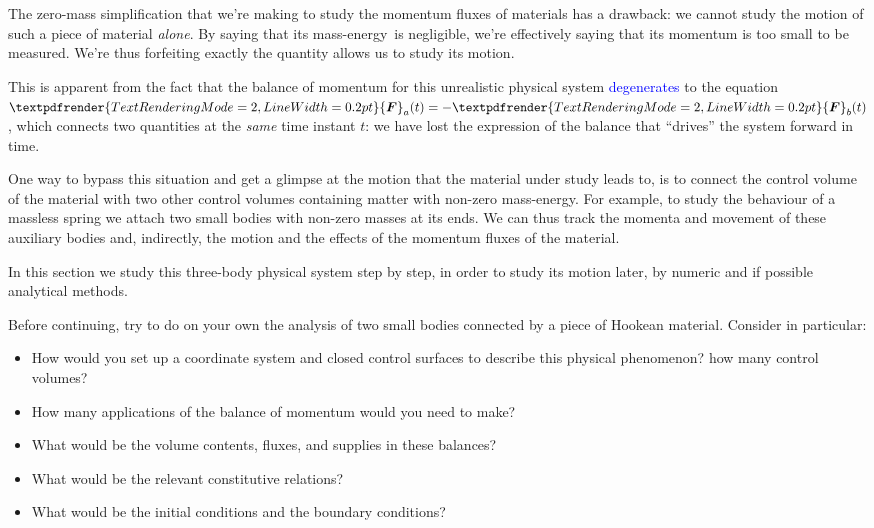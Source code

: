 \documentclass[a4paper,12pt,%
onecolumn,oneside,%
british%
]{memoir}
\renewcommand*{\bm}[1]{\textpdfrender{TextRenderingMode=2,LineWidth=0.2pt}{\boldsymbol{#1}}}
\renewcommand*{\|}[1][]{\nonscript\:#1\vert\nonscript\:\mathopen{}}
\newcommand*{\sect}{\S}%
\renewcommand*{\autoref}[3][\sect\,\ref]{\textcolor{blue}{#3}
\raisebox{0.6ex}{\color{blue}\miniscule%
\faIcon{angle-right}%
\;#1{#2}\;p.\,\pageref{#2}}}
\newcommand*{\masse}{mass-energy}
\newcommand*{\yF}{\bm{F}}
\newcommand*{\yFa}{\yF_{a}}
\newcommand*{\yFb}{\yF_{b}}
\begin{document}
The zero-mass simplification that we're making to study the momentum fluxes of materials has a drawback: we cannot study the motion of such a piece of material \emph{alone}. By saying that its \masse\ is negligible, we're effectively saying that its momentum is too small to be measured. We're thus forfeiting exactly the quantity allows us to study its motion.

This is apparent from the fact that the balance of momentum for this unrealistic physical system \autoref{sec:springs_consequences_balances}{degenerates} to the equation $\yFa(t) = -\yFb(t)$, which connects two quantities at the \emph{same} time instant $t$: we have lost the expression of the balance that \enquote{drives} the system forward in time.

One way to bypass this situation and get a glimpse at the motion that the material under study leads to, is to connect the control volume of the material with two other control volumes containing matter with non-zero \masse. For example, to study the behaviour of a massless spring we attach two small bodies with non-zero masses at its ends. We can thus track the momenta and movement of these auxiliary bodies and, indirectly, the motion and the effects of the momentum fluxes of the material.

\medskip

In this section we study this three-body physical system step by step, in order to study its motion later, by numeric and if possible analytical methods.

\begin{exercise}
  Before continuing, try to do on your own the analysis of two small bodies connected by a piece of Hookean material. Consider in particular:
  \begin{itemize}
  \item How would you set up a coordinate system and closed control surfaces to describe this physical phenomenon? how many control volumes?
  \item How many applications of the balance of momentum would you need to make?
  \item What would be the volume contents, fluxes, and supplies in these balances?
  \item What would be the relevant constitutive relations?
  \item What would be the initial conditions and the boundary conditions?
  \end{itemize}
\end{exercise}
\end{document}

